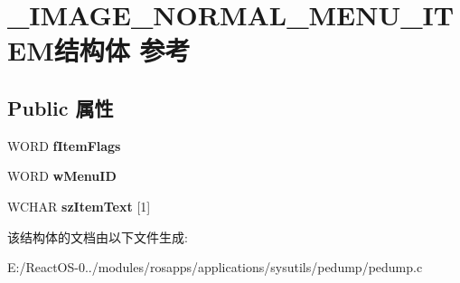 \hypertarget{struct___i_m_a_g_e___n_o_r_m_a_l___m_e_n_u___i_t_e_m}{}\section{\+\_\+\+I\+M\+A\+G\+E\+\_\+\+N\+O\+R\+M\+A\+L\+\_\+\+M\+E\+N\+U\+\_\+\+I\+T\+E\+M结构体 参考}
\label{struct___i_m_a_g_e___n_o_r_m_a_l___m_e_n_u___i_t_e_m}
\subsection*{Public 属性}
\begin{DoxyCompactItemize}
\item 
\mbox{\label{struct___i_m_a_g_e___n_o_r_m_a_l___m_e_n_u___i_t_e_m_a2d07c7eb6de7e4385c8d90a7bc039c8f}} 
W\+O\+RD {\bfseries f\+Item\+Flags}
\item 
\mbox{\label{struct___i_m_a_g_e___n_o_r_m_a_l___m_e_n_u___i_t_e_m_ac08919236c2dc426b6e07675f941a9b4}} 
W\+O\+RD {\bfseries w\+Menu\+ID}
\item 
\mbox{\label{struct___i_m_a_g_e___n_o_r_m_a_l___m_e_n_u___i_t_e_m_ac66193413d8e8231d80fa466d26b4327}} 
W\+C\+H\+AR {\bfseries sz\+Item\+Text} \mbox{[}1\mbox{]}
\end{DoxyCompactItemize}


该结构体的文档由以下文件生成\+:\begin{DoxyCompactItemize}
\item 
E\+:/\+React\+O\+S-\/0../modules/rosapps/applications/sysutils/pedump/pedump.\+c\end{DoxyCompactItemize}
